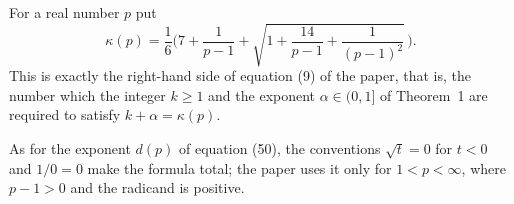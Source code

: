 \begin{definition}
For a real number $p$ put
\[
  \kappa(p)=\frac16\Biggl(7+\frac1{p-1}+\sqrt{1+\frac{14}{p-1}+\frac1{(p-1)^2}}\,\Biggr).
\]
This is exactly the right-hand side of equation (9) of the paper, that is, the
number which the integer $k\ge1$ and the exponent $\alpha\in(0,1]$ of
Theorem~1 are required to satisfy $k+\alpha=\kappa(p)$.

As for the exponent $d(p)$ of equation (50), the conventions $\sqrt t=0$ for $t<0$ and $1/0=0$ make
the formula total; the paper uses it only for $1<p<\infty$, where $p-1>0$ and
the radicand is positive.
\end{definition}
